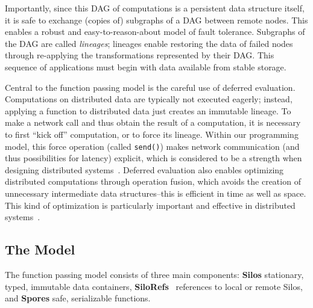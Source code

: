 \documentclass{jfp1}
\begin{document}
Importantly, since this DAG of computations is a persistent data structure
itself, it is safe to exchange (copies of) subgraphs of a DAG between remote
nodes. This enables a robust and easy-to-reason-about model of fault tolerance.
Subgraphs of the DAG are called \textit{lineages}; lineages enable restoring the
data of failed nodes through re-applying the transformations represented by
their DAG. This sequence of applications must begin with data available from
stable storage.

Central to the function passing model is the careful use of deferred evaluation.
Computations on distributed data are typically not executed eagerly; instead,
applying a function to distributed data just creates an immutable lineage. To
make a network call and thus obtain the result of a computation, it is necessary
to first ``kick off'' computation, or to force its lineage. Within our
programming model, this force operation (called \verb|send()|) makes network
communication (and thus possibilities for latency) explicit, which is considered
to be a strength when designing distributed systems~\cite{ANoteDistComp}.
Deferred evaluation also enables optimizing distributed computations through
operation fusion, which avoids the creation of unnecessary intermediate data
structures--this is efficient in time as well as space. This kind of
optimization is particularly important and effective in distributed
systems~\cite{FlumeJava}.


\subsection{The Model}

The function passing model consists of three main components: \textbf{Silos}
stationary, typed, immutable data containers, \textbf{SiloRefs}~ references to local or remote Silos, and
\textbf{Spores} safe, serializable functions.
\end{document}

